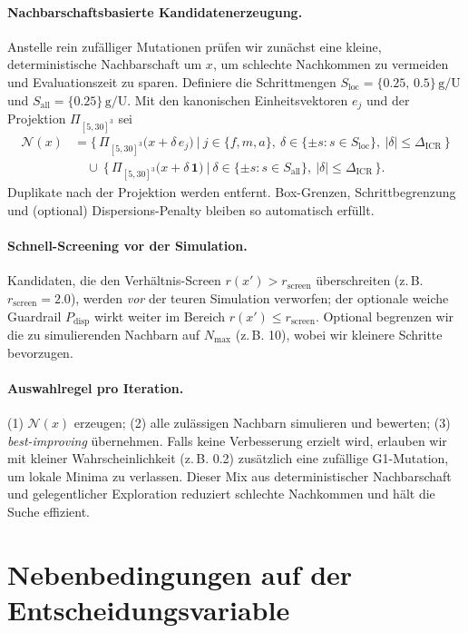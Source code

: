 \documentclass[ngerman,a4paper,12pt,pdftex]{article}
\newcommand{\DICR}{\Delta_{\mathrm{ICR}}}
\begin{document}
\paragraph{Nachbarschaftsbasierte Kandidatenerzeugung.}
Anstelle rein zufälliger Mutationen prüfen wir zunächst eine kleine, deterministische Nachbarschaft um \(x\), um schlechte Nachkommen zu vermeiden und Evaluationszeit zu sparen. Definiere die Schrittmengen \(S_{\text{loc}}=\{0.25,\,0.5\}\,\mathrm{g/U}\) und \(S_{\text{all}}=\{0.25\}\,\mathrm{g/U}\).
Mit den kanonischen Einheitsvektoren \(e_j\) und der Projektion \(\Pi_{[5,30]^3}\) sei
\[
\begin{aligned}
\mathcal{N}(x)
&= \Big\{\, \Pi_{[5,30]^3}\!\big(x+\delta\,e_j\big)\ \big|\ j\in\{f,m,a\},\ \delta\in\{\pm s : s\in S_{\text{loc}}\},\ |\delta|\le \DICR \,\Big\}\\
&\quad\cup\ \Big\{\, \Pi_{[5,30]^3}\!\big(x+\delta\,\mathbf{1}\big)\ \big|\ \delta\in\{\pm s : s\in S_{\text{all}}\},\ |\delta|\le \DICR \,\Big\}.
\end{aligned}
\]
Duplikate nach der Projektion werden entfernt. Box-Grenzen, Schrittbegrenzung und (optional) Dispersions-Penalty bleiben so automatisch erfüllt.

\paragraph{Schnell-Screening vor der Simulation.}
Kandidaten, die den Verhältnis-Screen \(r(x')>r_{\text{screen}}\) überschreiten (z.\,B. \(r_{\text{screen}}=2.0\)), werden \emph{vor} der teuren Simulation verworfen; der optionale weiche Guardrail \(P_{\mathrm{disp}}\) wirkt weiter im Bereich \(r(x')\le r_{\text{screen}}\).
Optional begrenzen wir die zu simulierenden Nachbarn auf \(N_{\max}\) (z.\,B. 10), wobei wir kleinere Schritte bevorzugen.

\paragraph{Auswahlregel pro Iteration.}
(1) \(\mathcal{N}(x)\) erzeugen; (2) alle zulässigen Nachbarn simulieren und bewerten; (3) \emph{best-improving} übernehmen.
Falls keine Verbesserung erzielt wird, erlauben wir mit kleiner Wahrscheinlichkeit (z.\,B. 0.2) zusätzlich eine zufällige G1-Mutation, um lokale Minima zu verlassen.
Dieser Mix aus deterministischer Nachbarschaft und gelegentlicher Exploration reduziert schlechte Nachkommen und hält die Suche effizient.


\section{Nebenbedingungen auf der Entscheidungsvariable}
\end{document}
